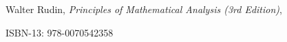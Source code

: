 \newpage
\begin{thebibliography}{8}
    Walter Rudin, \emph{Principles of Mathematical Analysis (3rd Edition)},

        ISBN-13: 978-0070542358
\end{thebibliography}
